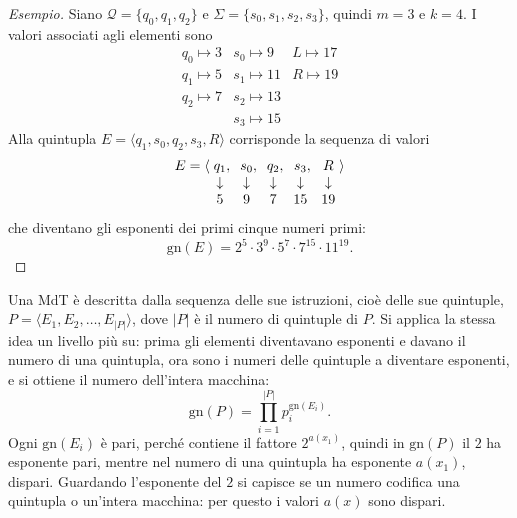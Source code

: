\documentclass[a4paper, 11pt, oneside]{book}
\theoremstyle{formale}
\newenvironment{esempio}
    {\begin{proof}[\textit{Esempio}]\renewcommand{\qedsymbol}{$\diamond$}}
    {\end{proof}}
\begin{document}
    \begin{esempio}
        Siano $\mathcal{Q} = \{q_0, q_1, q_2\}$ e $\Sigma = \{s_0, s_1, s_2, s_3\}$, quindi
        $m = 3$ e $k = 4$. I valori associati agli elementi sono
        \begin{equation*}
            \begin{array}{lll}
                q_0 \mapsto 3 & s_0 \mapsto 9  & L \mapsto 17 \\
                q_1 \mapsto 5 & s_1 \mapsto 11 & R \mapsto 19 \\
                q_2 \mapsto 7 & s_2 \mapsto 13 & \\
                              & s_3 \mapsto 15 &
            \end{array}
        \end{equation*}
        Alla quintupla $E = \langle q_1, s_0, q_2, s_3, R \rangle$ corrisponde la sequenza
        di valori
        \begin{equation*}
            \begin{array}{r@{\;}c@{\quad}c@{\quad}c@{\quad}c@{\quad}c@{\;}l}
                E = \langle & q_1\mathrlap{,} & s_0\mathrlap{,} & q_2\mathrlap{,}
                    & s_3\mathrlap{,} & R & \rangle \\
                & \downarrow & \downarrow & \downarrow & \downarrow & \downarrow & \\
                & 5 & 9 & 7 & 15 & 19 &
            \end{array}
        \end{equation*}
        che diventano gli esponenti dei primi cinque numeri primi:
        \begin{equation*}
            \mathrm{gn}(E) = 2^{5} \cdot 3^{9} \cdot 5^{7} \cdot 7^{15} \cdot 11^{19}.
        \end{equation*}
    \end{esempio}

    Una MdT \`e descritta dalla sequenza delle sue istruzioni, cio\`e delle sue quintuple,
    $P = \langle E_1, E_2, \dots, E_{|P|} \rangle$, dove $|P|$ \`e il numero di quintuple
    di $P$. Si applica la stessa idea un livello pi\`u
    su: prima gli elementi diventavano esponenti e davano il numero di una quintupla, ora
    sono i numeri delle quintuple a diventare esponenti, e si ottiene il numero
    dell'intera macchina:
    \begin{equation*}
        \mathrm{gn}(P) = \prod_{i=1}^{|P|} p_i^{\mathrm{gn}(E_i)}.
    \end{equation*}
    Ogni $\mathrm{gn}(E_i)$ \`e pari, perch\'e contiene il fattore $2^{a(x_1)}$, quindi in
    $\mathrm{gn}(P)$ il $2$ ha esponente pari, mentre nel numero di una quintupla ha
    esponente $a(x_1)$, dispari. Guardando l'esponente del $2$ si capisce se un numero
    codifica una quintupla o un'intera macchina: per questo i valori $a(x)$ sono dispari.
\end{document}
